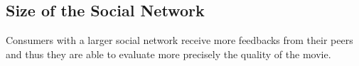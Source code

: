 \subsection{Size of the Social Network}\label{subsec2.4}

Consumers with a larger social network receive more feedbacks from their peers and thus they are able to evaluate more precisely the quality of the movie.

